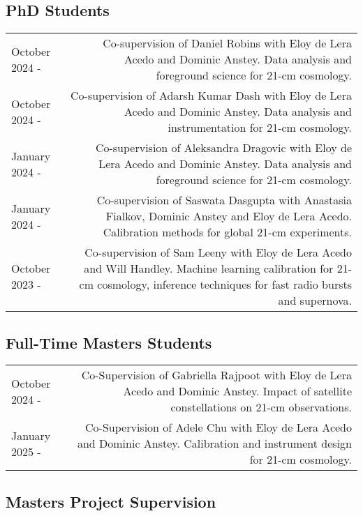 \documentclass{article}
\begin{document}
\subsection*{PhD Students}

\begin{tabular}{L!{\vrule}R}
    October 2024 - & Co-supervision of Daniel Robins with Eloy de Lera Acedo and Dominic Anstey. Data analysis and foreground science for 21-cm cosmology.\\
    October 2024 - & Co-supervision of Adarsh Kumar Dash with Eloy de Lera Acedo and Dominic Anstey. Data analysis and instrumentation for 21-cm cosmology.\\
    January 2024 - & Co-supervision of Aleksandra Dragovic with Eloy de Lera Acedo and Dominic Anstey. Data analysis and foreground science for 21-cm cosmology. \\
    January 2024 - & Co-supervision of Saswata Dasgupta with Anastasia Fialkov, Dominic Anstey and Eloy de Lera Acedo. Calibration methods for global 21-cm experiments. \\
	October 2023 - & Co-supervision of Sam Leeny with Eloy de Lera Acedo and Will Handley. Machine learning calibration for 21-cm cosmology, inference techniques for fast radio bursts and supernova. \\
\end{tabular}

\subsection*{Full-Time Masters Students}

\begin{tabular}{L!{\vrule}R}
    October 2024 - & Co-Supervision of Gabriella Rajpoot with Eloy de Lera Acedo and Dominic Anstey. Impact of satellite constellations on 21-cm observations. \\
    January 2025 - & Co-Supervision of Adele Chu with Eloy de Lera Acedo and Dominic Anstey. Calibration and instrument design for 21-cm cosmology.
\end{tabular}

\subsection*{Masters Project Supervision}
\end{document}
